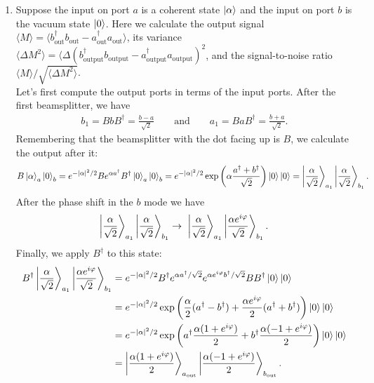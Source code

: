 \documentclass{article}
\theoremstyle{definition}
\newcommand{\al}{\alpha}
\newcommand{\f}[2]{\frac{#1}{#2}}
\newcommand{\lp}{\left(}
\newcommand{\rp}{\right)}
\begin{document}
\begin{enumerate}[label=(\alph*)]

\item Suppose the input on port $a$ is a coherent state $\ket{\al}$ and the input on port $b$ is the vacuum state $\ket{0}$. Here we calculate the output signal $\langle M \rangle = \langle b_\text{out}^\dagger b_\text{out} - a_\text{out} ^\dagger a_\text{out} \rangle$, its variance $\langle  \Delta M^2 \rangle = \langle \Delta (b_\text{output}^\dagger b_\text{output} - a_\text{output}^\dagger a_\text{output})^2$, and the signal-to-noise ratio $\langle M \rangle / \sqrt{\langle \Delta M^2 \rangle}$.\\

Let's first compute the output ports in terms of the input ports. After the first beamsplitter, we have 
\begin{align*}
b_1 = BbB^\dagger  = \f{b-a}{\sqrt{2}} \quad\quad \text{and} \quad\quad a_1 = BaB^\dagger = \f{b+a}{\sqrt{2}}.
\end{align*}
Remembering that the beamsplitter with the dot facing up is $B$, we calculate the output after it:
\begin{align*}
B\ket{\al}_a \ket{0}_b = e^{-\abs{\al}^2/2} B e^{\al a^\dagger } B^\dagger \ket{0}_a \ket{0}_b = 
e^{-\abs{\al}^2/2}\exp\lp \al \f{a^\dagger + b^\dagger }{\sqrt{2}} \rp \ket{0}\ket{0} = 
\ket{\f{\al}{\sqrt{2}} }_{a_1} \ket{ \f{\al}{\sqrt{2}}}_{b_1}.
\end{align*}
After the phase shift in the $b$ mode we have
\begin{align*}
\ket{\f{\al}{\sqrt{2}} }_{a_1} \ket{ \f{\al}{\sqrt{2}}}_{b_1} \to \
 \ket{\f{\al}{\sqrt{2}} }_{a_1} \ket{ \f{\al e^{i\varphi}}{\sqrt{2}}}_{b_1}.
\end{align*}
Finally, we apply $B^\dagger$ to this state: 
\begin{align*}
B^\dagger  \ket{\f{\al}{\sqrt{2}} }_{a_1} \ket{ \f{\al e^{i\varphi}}{\sqrt{2}}}_{b_1} 
&= e^{-\abs{\al}^2/2} B^\dagger e^{\al a^\dagger  /\sqrt{2}} e^{\al e^{i\varphi} b^\dagger  /\sqrt{2}  } BB^\dagger \ket{0} \ket{0} \\
&= e^{-\abs{\al}^2/2} \exp\lp \f{\al}{2}(  a^\dagger - b^\dagger)  + \f{\al e^{i\varphi}}{2}(a^\dagger + b^\dagger ) \rp  \ket{0} \ket{0}\\
&= e^{-\abs{\al}^2/2} \exp\lp a^\dagger \f{\al(1 + e^{i\varphi})}{2} + b^\dagger \f{\al(-1 + e^{i\varphi})}{2} \rp \ket{0} \ket{0}\\
&= \ket{\f{\al(1+e^{i\varphi})}{2}}_{a_\text{out}} \ket{\f{\al(-1+e^{i\varphi})}{2}}_{b_\text{out}}.

\end{align*}
\end{enumerate}
\end{document}
